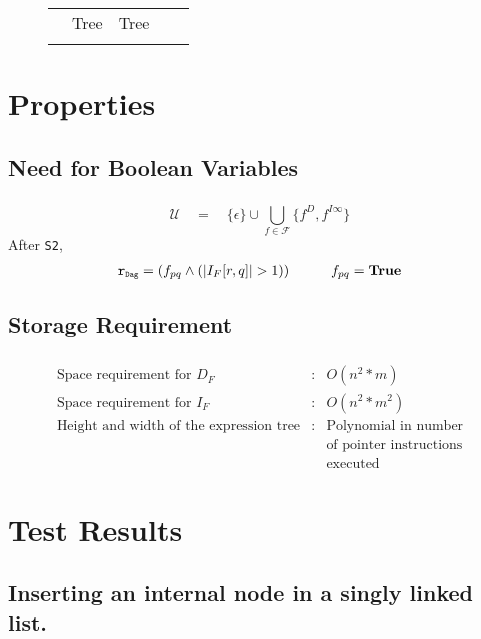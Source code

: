 \documentclass[mathserif,10pt]{beamer}
\newcommand{\epsilonset}{\ensuremath{\{\epsilon\}}}
\newcommand{\upath}{\ensuremath{\mathcal{U}}}
\newcommand{\mb}[1]{\mbox{{\tt #1}}}
\newcommand{\Dag}{{\tt Dag}}
\newcommand{\drct}{\ensuremath{D}}
\newcommand{\indrct}{\ensuremath{I}}
\newcommand{\fields}{\ensuremath{\mathcal{F}}}
\newcommand{\IFM}[2]{\ensuremath{I_F[#1,#2]}}
\newcommand{\subD}{\mbox{\scalebox{0.6}{\Dag}}}
\newcommand{\true}{\textbf{True}}
\begin{document}
{{\begin{figure}
\begin{center}
{\begin{tabular}{ |@{}l@{ }|@{}c@{}|@{}c@{}|@{}c@{}|@{}c@{}|  }
																		& Tree & Tree\\
	 &&&& \\
     \hline
    \end{tabular}}
  \end{center}
\end{figure}
}

\section{Properties}
\subsection{Need for Boolean Variables}
\frame
{
	\frametitle{\subsecname}

	
	\[ \upath \quad=\quad \epsilonset \cup \bigcup_{f\in\fields} \{f^{\drct},
f^{\indrct\infty}\} \]
	After {\tt S2},
	\begin{eqnarray*}
   \mb{r}_{\subD} = (f_{pq} \wedge (|\IFM{r}{q}| > 1))
   	&\qquad& f_{pq} = \true
 	\end{eqnarray*}
}

\subsection{Storage Requirement}
\frame
{
	\frametitle{\subsecname}
	\begin{eqnarray*}
\mbox{Space requirement for } D_F &:&  O(n^{2}* m) \\
\mbox{Space requirement for } I_F &:& O(n^{2} * m^2) \\
\mbox{Height and width of the expression tree} &:& \mbox{Polynomial in number} \\
												&& \mbox{of pointer instructions} \\
												&& \mbox{executed}
\end{eqnarray*}
}

\section{Test Results}
\subsection{Inserting an internal node in a singly linked list.}
\frame
{
	\frametitle{\subsecname}

	\newcommand{\on}{p} 
	\newcommand{\nn}{r}

}}
\end{document}
